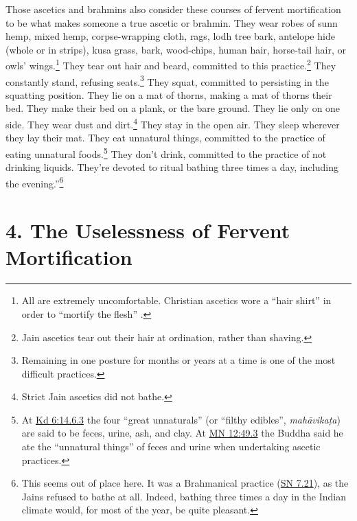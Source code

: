 \documentclass[12pt,openany]{book}%
\begin{document}
Those ascetics and brahmins also consider these courses of fervent mortification to be what makes someone a true ascetic or brahmin. They wear robes of sunn hemp, mixed hemp, corpse-wrapping cloth, rags, lodh tree bark, antelope hide (whole or in strips), kusa grass, bark, wood-chips, human hair, horse-tail hair, or owls’ wings.\footnote{All are extremely uncomfortable. Christian ascetics wore a “hair shirt” in order to “mortify the flesh” . } They tear out hair and beard, committed to this practice.\footnote{Jain ascetics tear out their hair at ordination, rather than shaving. } They constantly stand, refusing seats.\footnote{Remaining in one posture for months or years at a time is one of the most difficult practices. } They squat, committed to persisting in the squatting position. They lie on a mat of thorns, making a mat of thorns their bed. They make their bed on a plank, or the bare ground. They lie only on one side. They wear dust and dirt.\footnote{Strict Jain ascetics did not bathe. } They stay in the open air. They sleep wherever they lay their mat. They eat unnatural things, committed to the practice of eating unnatural foods.\footnote{At \href{https://suttacentral.net/pli-tv-kd6/en/sujato\#14.6.3}{Kd 6:14.6.3} the four “great unnaturals” (or “filthy edibles”, \textit{\textsanskrit{mahāvikaṭa}}) are said to be feces, urine, ash, and clay. At \href{https://suttacentral.net/mn12/en/sujato\#49.3}{MN 12:49.3} the Buddha said he ate the “unnatural things” of feces and urine when undertaking ascetic practices. } They don’t drink, committed to the practice of not drinking liquids. They’re devoted to ritual bathing three times a day, including the evening.”\footnote{This seems out of place here. It was a Brahmanical practice (\href{https://suttacentral.net/sn7.21/en/sujato}{SN 7.21}), as the Jains refused to bathe at all. Indeed, bathing three times a day in the Indian climate would, for most of the year, be quite pleasant. } 

\section*{4. The Uselessness of Fervent Mortification }
\end{document}
